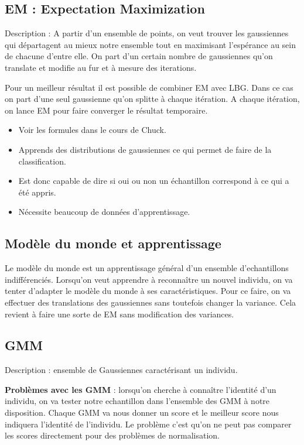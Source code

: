 \documentclass[a4paper, 12pt, leqno]{article}
\begin{document}
\subsection{EM : Expectation Maximization}

Description : A partir d'un ensemble de points, on veut trouver les gaussiennes
qui départagent au mieux notre ensemble tout en maximisant l'espérance au
sein de chacune d'entre elle.
On part d'un certain nombre de gaussiennes qu'on translate et modifie au fur et
à mesure des iterations.

Pour un meilleur résultat il est possible de combiner EM avec LBG. Dans ce cas
on part d'une seul gaussienne qu'on splitte à chaque itération. A chaque
itération, on lance EM pour faire converger le résultat temporaire.

\begin{itemize}
  \item Voir les formules dans le cours de Chuck.
  \item Apprends des distributions de gaussiennes ce qui permet de faire de la
  classification.
  \item Est donc capable de dire si oui ou non un échantillon correspond à
  ce qui a été appris.
  \item Nécessite beaucoup de données d'apprentissage.
\end{itemize}

\subsection{Modèle du monde et apprentissage}

Le modèle du monde est un apprentissage général d'un ensemble
d'echantillons indifférenciés. Lorsqu'on veut apprendre à reconnaître un
nouvel individu, on va tenter d'adapter le modèle du monde à ses
caractéristiques. Pour ce faire, on va effectuer des translations des
gaussiennes sans toutefois changer la variance. Cela revient à faire une sorte
de EM sans modification des variances.

\subsection{GMM}

Description : ensemble de Gaussiennes caractérisant un individu.

\textbf{Problèmes avec les GMM} : lorsqu'on cherche à connaître
l'identité d'un individu, on va tester notre echantillon dans l'ensemble des
GMM à notre disposition. Chaque GMM va nous donner un score et le meilleur
score nous indiquera l'identité de l'individu. Le problème c'est qu'on ne
peut pas comparer les scores directement pour des problèmes de normalisation.
\end{document}
